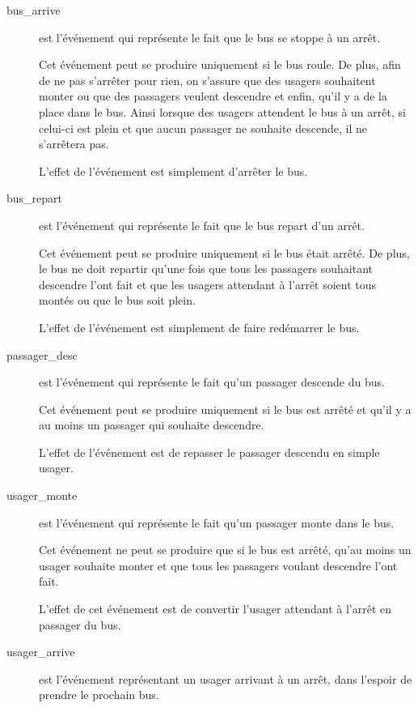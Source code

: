 \documentclass[a4paper,titlepage]{report}
\begin{document}
		\begin{description}
			\item[bus\_arrive] est l'événement qui représente le fait que le bus se stoppe à un arrêt.
			
			Cet événement peut se produire uniquement si le bus roule. De plus, afin de ne pas s'arrêter pour rien, on s'assure que des usagers souhaitent monter ou que des passagers veulent descendre et enfin, qu'il y a de la place dans le bus. Ainsi lorsque des usagers attendent le bus à un arrêt, si celui-ci est plein et que aucun passager ne souhaite descende, il ne s'arrêtera pas.
			
			L'effet de l'événement est simplement d'arrêter le bus.\\
		
			\item[bus\_repart] est l'événement qui représente le fait que le bus repart d'un arrêt.
			
			Cet événement peut se produire uniquement si le bus était arrêté. De plus, le bus ne doit repartir qu'une fois que tous les passagers souhaitant descendre l'ont fait et que les usagers attendant à l'arrêt soient tous montés ou que le bus soit plein.
			
			L'effet de l'événement est simplement de faire redémarrer le bus.\\
			
			\item[passager\_desc] est l'événement qui représente le fait qu'un passager descende du bus.
			
			Cet événement peut se produire uniquement si le bus est arrêté et qu'il y a au moins un passager qui souhaite descendre.
			
			L'effet de l'événement est de repasser le passager descendu en simple usager. \\
			
			\item[usager\_monte] est l'événement qui représente le fait qu'un passager monte dans le bus.
			
			Cet événement ne peut se produire que si le bus est arrêté, qu'au moins un usager souhaite monter et que tous les passagers voulant descendre l'ont fait.
			
			L'effet de cet événement est de convertir l'usager attendant à l'arrêt en passager du bus.\\
			
			\item[usager\_arrive] est l'événement représentant un usager arrivant à un arrêt, dans l'espoir de prendre le prochain bus.
			

\end{description}
\end{document}
